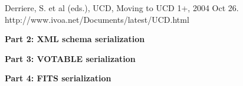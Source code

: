 \documentclass[11pt]{article}
\newcommand{\htpart}[1]{\centerline{\bf #1}}
\begin{document}
\vskip 0.1in
\par\noindent
Derriere, S. et al (eds.), UCD, Moving to UCD 1+, 2004 Oct 26.
\\
http://www.ivoa.net/Documents/latest/UCD.html


\clearpage




{\Large
\vfill
\htpart{Part 2: XML schema serialization}
\vfill
}


\clearpage




\clearpage



{\Large
\vfill
\vskip 5.0in
\htpart{Part 3: VOTABLE serialization}
\vfill
}

\clearpage

\clearpage




{\Large
\vfill
\vskip 5.0in
\htpart{Part 4: FITS serialization}
\vfill
}

\clearpage

\end{document}
